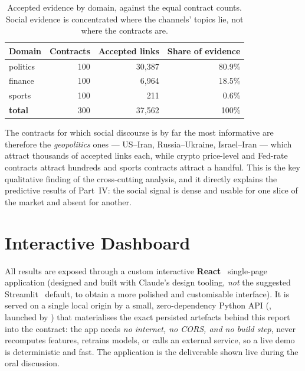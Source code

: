\begin{table}[H]
\centering
\caption{Accepted evidence by domain, against the equal contract counts. Social evidence
is concentrated where the channels' topics lie, not where the contracts are.}
\label{tab:mismatch}
\small
\begin{tabular}{@{}l r r r@{}}
\toprule
\textbf{Domain} & \textbf{Contracts} & \textbf{Accepted links} & \textbf{Share of evidence}\\
\midrule
politics & 100 & 30{,}387 & 80.9\%\\
finance  & 100 & 6{,}964  & 18.5\%\\
sports   & 100 & 211      & 0.6\%\\
\midrule
\textbf{total} & 300 & 37{,}562 & 100\%\\
\bottomrule
\end{tabular}
\end{table}

\noindent The contracts for which social discourse is by far the most informative are
therefore the \emph{geopolitics} ones --- US--Iran, Russia--Ukraine, Israel--Iran ---
which attract thousands of accepted links each, while crypto price-level and Fed-rate
contracts attract hundreds and sports contracts attract a handful. This is the key
qualitative finding of the cross-cutting analysis, and it directly explains the
predictive results of Part~IV: the social signal is dense and usable for one slice of
the market and absent for another.


\chapter{Interactive Dashboard}
\label{ch:dashboard}

All results are exposed through a custom interactive \textbf{React}~\cite{react}
single-page application (designed and built with Claude's design tooling, \emph{not} the
suggested Streamlit~\cite{streamlit2023} default, to obtain a more polished and
customisable interface). It is served on a single local origin by a small, zero-dependency
Python API (, launched by ) that materialises
the exact persisted artefacts behind this report into the  contract:
the app needs \emph{no internet, no CORS, and no build step}, never recomputes features,
retrains models, or calls an external service, so a live demo is deterministic and fast.
The application is the deliverable shown live during the oral discussion.

